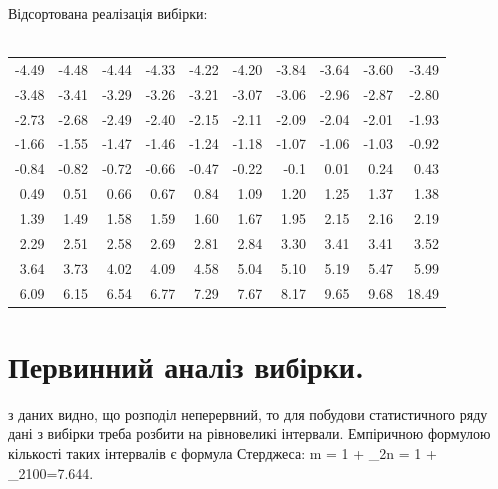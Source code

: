 \documentclass[14pt,a4paper]{scrartcl}
\begin{document}
Відсортована реалізація вибірки:\\\\
\begin{tabular}{r r r r r r r r r r}
-4.49 & -4.48 & -4.44 & -4.33 & -4.22 & -4.20 & -3.84 & -3.64 & -3.60 & -3.49\\
-3.48 & -3.41 & -3.29 & -3.26 & -3.21 & -3.07 & -3.06 & -2.96 & -2.87 & -2.80\\
-2.73 & -2.68 & -2.49 & -2.40 & -2.15 & -2.11 & -2.09 & -2.04 & -2.01 & -1.93\\
-1.66 & -1.55 & -1.47 & -1.46 & -1.24 & -1.18 & -1.07 & -1.06 & -1.03 & -0.92\\
-0.84 & -0.82 & -0.72 & -0.66 & -0.47 & -0.22 & -0.1 & 0.01 & 0.24 & 0.43\\
0.49 & 0.51 & 0.66 & 0.67 & 0.84 & 1.09 & 1.20 & 1.25 & 1.37 & 1.38\\
1.39 & 1.49 & 1.58 & 1.59 & 1.60 & 1.67 & 1.95 & 2.15 & 2.16 & 2.19\\
2.29 & 2.51 & 2.58 & 2.69 & 2.81 & 2.84 & 3.30 & 3.41 & 3.41 & 3.52\\
3.64 & 3.73 & 4.02 & 4.09 & 4.58 & 5.04 & 5.10 & 5.19 & 5.47 & 5.99\\
6.09 & 6.15 & 6.54 & 6.77 & 7.29 & 7.67 & 8.17 & 9.65 & 9.68 & 18.49
\end{tabular}\newpage


\section{Первинний аналіз вибірки.}
 з даних видно, що розподіл неперервний, то для побудови статистичного ряду дані з вибірки треба розбити на рівновеликі інтервали. Емпіричною формулою кількості таких інтервалів є формула Стерджеса:
\be m = 1 + \log_2{n} = 1 + \log_2{100}=7.644.\ee
\end{document}
